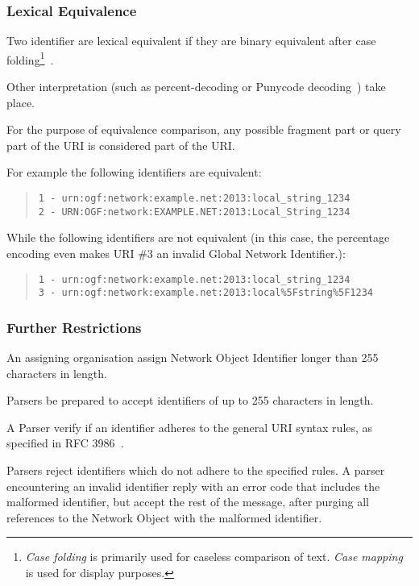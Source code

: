\subsubsection{Lexical Equivalence}

Two identifier are lexical equivalent if they are binary equivalent after case folding\footnote{\emph{Case folding} is primarily used for caseless comparison of text. \emph{Case mapping} is used for display purposes.}~\cite{casefolding}.

Other interpretation (such as percent-decoding or Punycode decoding~\cite{punycode}) \MUSTNOT{} take place.

For the purpose of equivalence comparison, any possible fragment part or query part of the URI is considered part of the URI.

For example the following identifiers are equivalent:

\begin{quote}
  \texttt{1 - urn:ogf:network:example.net:2013:local\_string\_1234}\\
  \texttt{2 - URN:OGF:network:EXAMPLE.NET:2013:Local\_String\_1234}
\end{quote}

While the following identifiers are not equivalent (in this case, the percentage encoding even makes URI \#3 an invalid Global Network Identifier.):

\begin{quote}
  \texttt{1 - urn:ogf:network:example.net:2013:local\_string\_1234}\\
  \texttt{3 - urn:ogf:network:example.net:2013:local\%5Fstring\%5F1234}
\end{quote}

\subsubsection{Further Restrictions}

An assigning organisation \MUSTNOT{} assign Network Object Identifier longer than 255 characters in length.

Parsers \MUST{} be prepared to accept identifiers of up to 255 characters in length.

A Parser \SHOULD{} verify if an identifier adheres to the general URI syntax rules, as specified in RFC 3986~\cite{rfc3986}.

Parsers \SHOULD{} reject identifiers which do not adhere to the specified rules. A parser encountering an invalid identifier \SHOULD{} reply with an error code that includes the malformed identifier, but \MAY{} accept the rest of the message, after purging all references to the Network Object with the malformed identifier.

